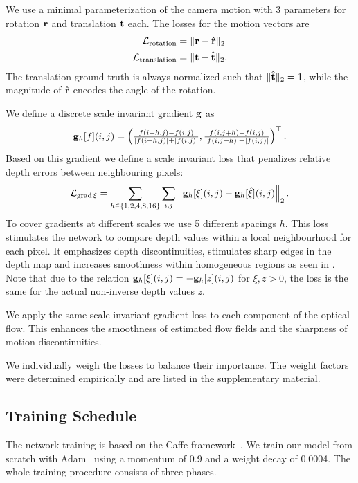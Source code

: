 \documentclass[10pt,twocolumn,letterpaper]{article}
\begin{document}
We use a minimal parameterization of the camera motion with 3 parameters for rotation $\mathbf{r}$ and translation $\mathbf{t}$ each.
The losses for the motion vectors are
\begin{equation}
\begin{aligned}
\mathcal{L}_\text{rotation} &= \Vert \mathbf{r} - \hat{\mathbf{r}} \Vert_2 \\
\mathcal{L}_\text{translation} &= \Vert \mathbf{t} - \hat{\mathbf{t}} \Vert_2.
\end{aligned}
\end{equation}
The translation ground truth is always normalized such that $\Vert \hat{\mathbf{t}} \Vert_2 = 1$, while the magnitude of $\hat{\mathbf{r}}$ encodes the angle of the rotation.

We define a discrete scale invariant gradient $\mathbf{g}$ as
\begin{equation}
\mathbf{g}_h[f](i,j) = \left( \tfrac{f(i+h,j) - f(i,j)}{\vert f(i+h,j) \vert + \vert f(i,j) \vert}, \tfrac{f(i,j+h) - f(i,j)}{\vert f(i,j+h) \vert + \vert f(i,j) \vert} \right)^\top.
\end{equation}
Based on this gradient we define a scale invariant loss that penalizes relative depth errors between neighbouring pixels:
\begin{equation}
\label{eq:loss_grad}
\mathcal{L}_{\text{grad}\, \xi} = \sum_{h \in \{1,2,4,8,16\}} \sum_{i,j} \left\Vert \mathbf{g}_h[\xi](i,j) - \mathbf{g}_h[\hat\xi](i,j)\right\Vert_2.
\end{equation}
To cover gradients at different scales we use 5 different spacings $h$.
This loss stimulates the network to compare depth values within a local neighbourhood for each pixel.
It emphasizes depth discontinuities, stimulates sharp edges in the depth map and increases smoothness within homogeneous regions as seen in .
Note that due to the relation $\mathbf{g}_h[\xi](i,j) = - \mathbf{g}_h[z](i,j)$ for $\xi, z > 0$, the loss is the same for the actual non-inverse depth values $z$.

We apply the same scale invariant gradient loss to each component of the optical flow.
This enhances the smoothness of estimated flow fields and the sharpness of motion discontinuities.

 We individually weigh the losses to 
balance their importance.
The weight factors were determined empirically and are listed in the supplementary material.


\subsection{Training Schedule}
The network training is based on the Caffe framework~\cite{jia_caffe:_2014}. We train our model from scratch with Adam~\cite{kingma_adam:_2014} using a momentum of 0.9 and a weight decay of 0.0004. 
The whole training procedure consists of three phases.%
\end{document}
